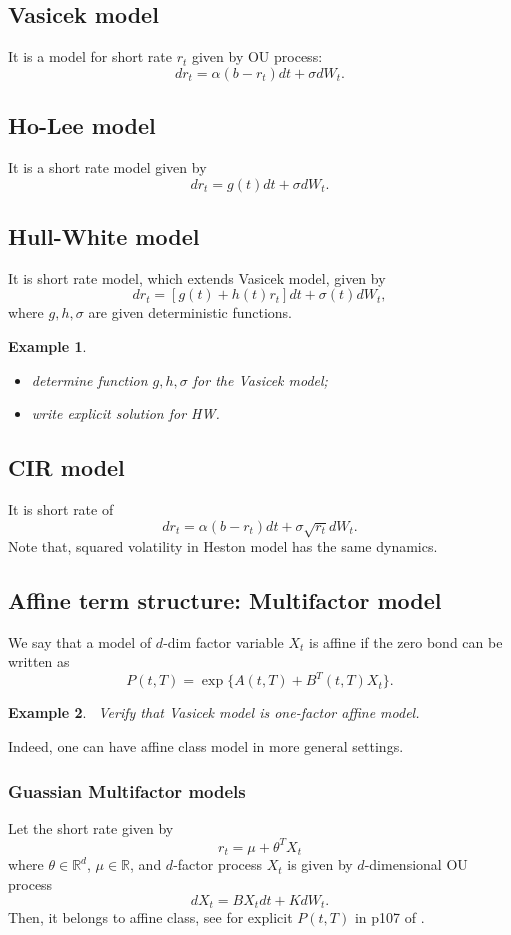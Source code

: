 \documentclass{article}
\newtheorem{example}{Example}
\begin{document}
\subsection{Vasicek model}
It is a model for short rate $r_t$ given by OU process:
$$d r_t = \alpha(b - r_t) dt + \sigma dW_t.$$

\subsection{Ho-Lee model}
It is a short rate model given by
$$d r_t = g(t) dt + \sigma dW_t.$$

\subsection{Hull-White model}
It is short rate model, which extends Vasicek model, given by
$$dr_t = [g(t) + h(t) r_t] dt + \sigma(t) dW_t,$$
where $g, h, \sigma$ are given deterministic functions.

\begin{example}
\label{exm:hw01}\begin{itemize}
\item determine function $g, h, \sigma$ for the Vasicek model;
\item write explicit solution for HW.
\end{itemize}
\end{example}


\subsection{CIR model}
It is short rate of
$$d r_t = \alpha(b - r_t) dt + \sigma \sqrt{r_t} dW_t.$$
Note that, squared volatility in Heston model has the same dynamics.

\subsection{Affine term structure: Multifactor model}



We say that a model of $d$-dim factor variable $X_{t}$  is affine if the zero bond can be written as
$$P(t, T) = \exp\{A(t, T) + B^{T}(t, T) X_{t}\}.$$

\begin{example}
\label{exm:mf01}\
Verify that Vasicek model is one-factor affine model.
\end{example}

Indeed, one can have affine class model in more general settings.

\subsubsection{Guassian Multifactor models}
Let the short rate given by 
$$r_t = \mu + \theta^T X_t$$
where $\theta\in \mathbb R^d$, $\mu \in\mathbb R$,  
and $d$-factor process $X_t$ is given by $d$-dimensional OU process
$$d X_t =BX_t dt + K dW_t.$$
Then, it belongs to affine class, see for explicit $P(t, T)$ in  p107 of \cite{Cai04}.





%
%

\end{document}
